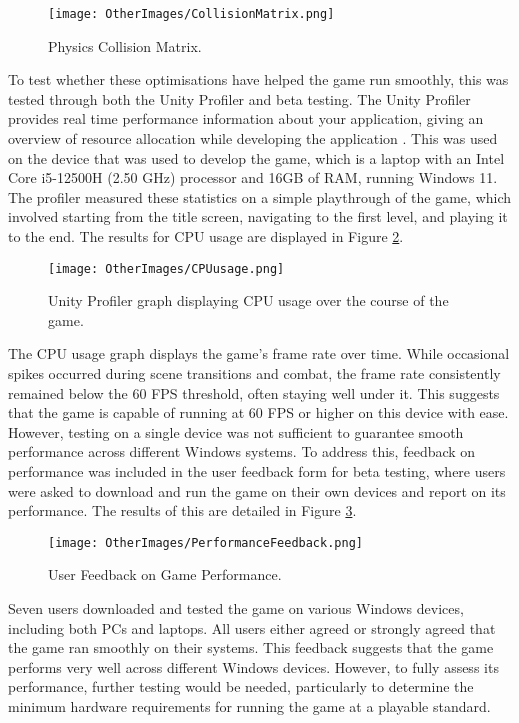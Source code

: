 \documentclass[10pt]{final_report}
\begin{document}
\begin{figure}[H]
    \centering
    \texttt{[image: OtherImages/CollisionMatrix.png]}
    \caption{Physics Collision Matrix.}
    \label{collisionmatrix}
\end{figure}

To test whether these optimisations have helped the game run smoothly, this was tested through both the Unity Profiler and beta testing. The Unity Profiler provides real time performance information about your application, giving an overview of resource allocation while developing the application \cite{UnityProfiler}. This was used on the device that was used to develop the game, which is a laptop with an Intel Core i5-12500H (2.50 GHz) processor and 16GB of RAM, running Windows 11. The profiler measured these statistics on a simple playthrough of the game, which involved starting from the title screen, navigating to the first level, and playing it to the end. The results for CPU usage are displayed in Figure \ref{fig:label_CPU}.

\begin{figure}[H]
    \centering
    \texttt{[image: OtherImages/CPUusage.png]}
    \caption{Unity Profiler graph displaying CPU usage over the course of the game.}
    \label{fig:label_CPU}
\end{figure}

The CPU usage graph displays the game's frame rate over time. While occasional spikes occurred during scene transitions and combat, the frame rate consistently remained below the 60 FPS threshold, often staying well under it. This suggests that the game is capable of running at 60 FPS or higher on this device with ease. 
However, testing on a single device was not sufficient to guarantee smooth performance across different Windows systems. To address this, feedback on performance was included in the user feedback form for beta testing, where users were asked to download and run the game on their own devices and report on its performance. The results of this are detailed in Figure \ref{performancefeedback}. 

\begin{figure}[H]
    \centering
    \texttt{[image: OtherImages/PerformanceFeedback.png]}
    \caption{User Feedback on Game Performance.}
    \label{performancefeedback}
\end{figure}

Seven users downloaded and tested the game on various Windows devices, including both PCs and laptops. All users either agreed or strongly agreed that the game ran smoothly on their systems. This feedback suggests that the game performs very well across different Windows devices. However, to fully assess its performance, further testing would be needed, particularly to determine the minimum hardware requirements for running the game at a playable standard.
\end{document}
